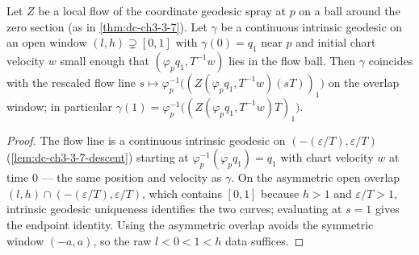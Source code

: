 \begin{lemma}
  \label{lem:dc-ch3-4-2-endpoint-id}


  Let $Z$ be a local flow of the coordinate geodesic spray at $p$ on a ball around the zero section
  (as in \cref{thm:dc-ch3-3-7}). Let $\gamma$ be a continuous intrinsic geodesic on an open window
  $(l,h)\supsetneq[0,1]$ with $\gamma(0)=q_1$ near $p$ and initial chart velocity $w$ small enough that
  $(\varphi_p q_1,T^{-1}w)$ lies in the flow ball. Then $\gamma$ coincides with the rescaled flow line
  $s\mapsto\varphi_p^{-1}\big((Z(\varphi_p q_1,T^{-1}w)(sT))_1\big)$ on the overlap window; in
  particular $\gamma(1)=\varphi_p^{-1}\big((Z(\varphi_p q_1,T^{-1}w)T)_1\big)$.
\end{lemma}
\begin{proof}
  \sketch

  The flow line is a continuous intrinsic geodesic on $(-(\varepsilon/T),\varepsilon/T)$
  (\cref{lem:dc-ch3-3-7-descent}) starting at $\varphi_p^{-1}(\varphi_p q_1)=q_1$ with chart velocity
  $w$ at time $0$ --- the same position and velocity as $\gamma$. On the asymmetric open overlap
  $(l,h)\cap(-(\varepsilon/T),\varepsilon/T)$, which contains $[0,1]$ because $h>1$ and
  $\varepsilon/T>1$, intrinsic geodesic uniqueness identifies the two curves; evaluating at $s=1$ gives
  the endpoint identity. Using the asymmetric overlap avoids the symmetric window $(-a,a)$, so the raw
  $l<0<1<h$ data suffices.
\end{proof}

